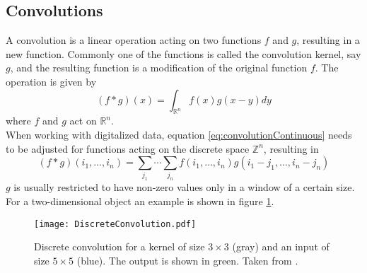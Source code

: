 \subsection{Convolutions}
A convolution is a linear operation acting on two functions $f$ and $g$, resulting in a new function. Commonly one of the functions is called the convolution kernel, say $g$, and the resulting function is a modification of the original function $f$. The operation is given by
\begin{equation} \label{eq:convolutionContinuous}
(f*g)(x) = \int_{\mathbb{R}^n} f(x)g(x-y)dy
\end{equation}
where $f$ and $g$ act on $\mathbb{R}^n$.  \\

When working with digitalized data, equation \ref{eq:convolutionContinuous} needs to be adjusted for functions acting on the discrete space $\mathbb{Z}^n$, resulting in
\begin{equation}\label{eq:convolutionDiscrete}
(f*g)(i_1,\dots ,i_n) = \sum_{j_1} \cdots \sum_{j_n} f(i_1,\dots ,i_n) g(i_1-j_1,\dots ,i_n-j_n)
\end{equation}
$g$ is usually restricted to have non-zero values only in a window of a certain size. For a two-dimensional object an example is shown in figure \ref{fig:Convolution}. \\

\begin{figure}[H]
\centering
\texttt{[image: DiscreteConvolution.pdf]}
\caption{Discrete convolution for a kernel of size $3\times 3$ (gray) and an input of size $5\times 5$ (blue). The output is shown in green. Taken from \cite{RajaKishor2016}.}
\label{fig:Convolution}
\end{figure}

